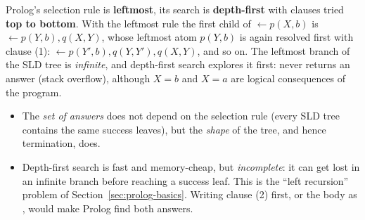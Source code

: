\begin{nbwarning}
\notinslides
Prolog's selection rule is \textbf{leftmost}, its search is \textbf{depth-first} with clauses
tried \textbf{top to bottom}. With the leftmost rule the first child of
$\leftarrow p(X, b)$ is $\leftarrow p(Y, b), q(X, Y)$, whose leftmost atom $p(Y, b)$ is again
resolved first with clause (1): $\leftarrow p(Y', b), q(Y, Y'), q(X, Y)$, and so on. The
leftmost branch of the SLD tree is \emph{infinite}, and depth-first search explores it first:
 never returns an answer (stack overflow), although $X = b$ and $X = a$ are
logical consequences of the program.
\begin{itemize}[nosep]
  \item The \emph{set of answers} does not depend on the selection rule (every SLD tree
        contains the same success leaves), but the \emph{shape} of the tree, and hence
        termination, does.
  \item Depth-first search is fast and memory-cheap, but \emph{incomplete}: it can get lost in
        an infinite branch before reaching a success leaf. This is the ``left recursion''
        problem of Section~\ref{sec:prolog-basics}. Writing clause (2) first, or the body as
        , would make Prolog find both answers.
\end{itemize}
\end{nbwarning}

\begin{center}
\end{center}
